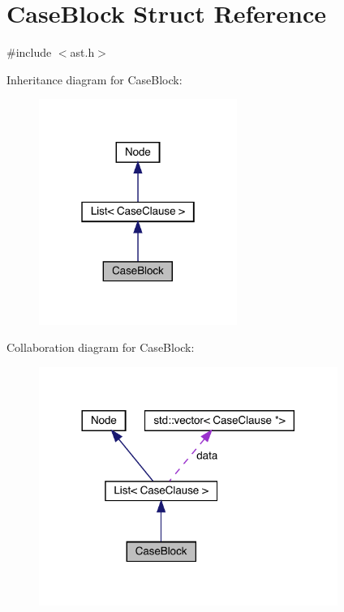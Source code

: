 \hypertarget{struct_case_block}{}\section{Case\+Block Struct Reference}
\label{struct_case_block}


{\ttfamily \#include $<$ast.\+h$>$}



Inheritance diagram for Case\+Block\+:\nopagebreak
\begin{figure}[H]
\begin{center}
\leavevmode
\includegraphics[width=183pt]{struct_case_block__inherit__graph}
\end{center}
\end{figure}


Collaboration diagram for Case\+Block\+:\nopagebreak
\begin{figure}[H]
\begin{center}
\leavevmode
\includegraphics[width=276pt]{struct_case_block__coll__graph}
\end{center}
\end{figure}
